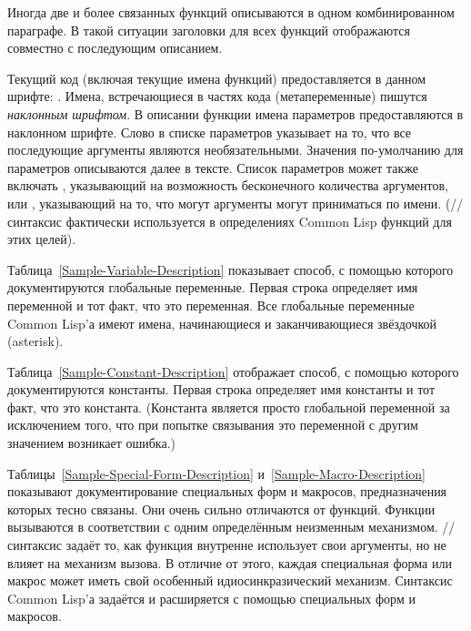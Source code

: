 Иногда две и более связанных функций описываются в одном комбинированном
параграфе. В такой ситуации заголовки для всех функций отображаются совместно с
последующим описанием.

Текущий код (включая текущие имена функций) предоставляется в данном
шрифте: .
Имена, встречающиеся в частях кода (метапеременные) пишутся \emph{наклонным
шрифтом}. В описании функции имена параметров предоставляются в наклонном
шрифте. Слово  в списке параметров указывает на то, что все
последующие аргументы являются необязательными. Значения по-умолчанию для
параметров описываются далее в тексте. Список параметров может также
включать , указывающий на возможность бесконечного количества
аргументов, или , указывающий на то, что могут аргументы могут
приниматься по имени.
(// синтаксис фактически используется в
определениях Common Lisp функций для этих целей).

Таблица~\ref{Sample-Variable-Description} показывает способ, с помощью которого
документируются глобальные переменные. Первая строка определяет имя переменной и 
тот факт, что это переменная.
Все глобальные переменные Common Lisp'а имеют имена, начинающиеся и
заканчивающиеся звёздочкой (asterisk).

Таблица~\ref{Sample-Constant-Description} отображает способ, с помощью которого
документируются константы. Первая строка определяет имя константы и тот факт, что это
константа.
(Константа является просто глобальной переменной за исключением того, что
 при попытке связывания это переменной с другим значением возникает ошибка.)

Таблицы~\ref{Sample-Special-Form-Description} и~\ref{Sample-Macro-Description}
показывают документирование специальных форм и макросов, предназначения которых
тесно связаны.
Они очень сильно отличаются от функций.
Функции вызываются в соответствии с одним определённым неизменным механизмом.
// синтаксис задаёт то, как функция
внутренне использует свои аргументы, но не влияет на механизм вызова.
В отличие от этого, каждая специальная форма или макрос может иметь свой
особенный идиосинкразический механизм. Синтаксис Common Lisp'а задаётся и
расширяется с помощью специальных форм и макросов.

